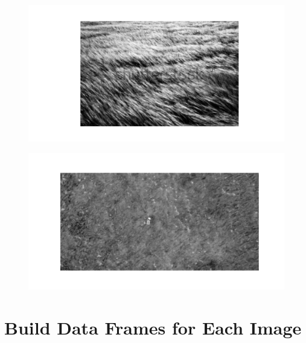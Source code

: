 \documentclass[
  letterpaper,
  DIV=11,
  numbers=noendperiod]{scrreprt}
\begin{document}
\begin{figure}[H]

{\centering \includegraphics{results_files/figure-pdf/unnamed-chunk-5-3.pdf}

}

\end{figure}

\begin{figure}[H]

{\centering \includegraphics{results_files/figure-pdf/unnamed-chunk-5-4.pdf}

}

\end{figure}

\hypertarget{build-data-frames-for-each-image}{%
\section{Build Data Frames for Each
Image}\label{build-data-frames-for-each-image}}
\end{document}
